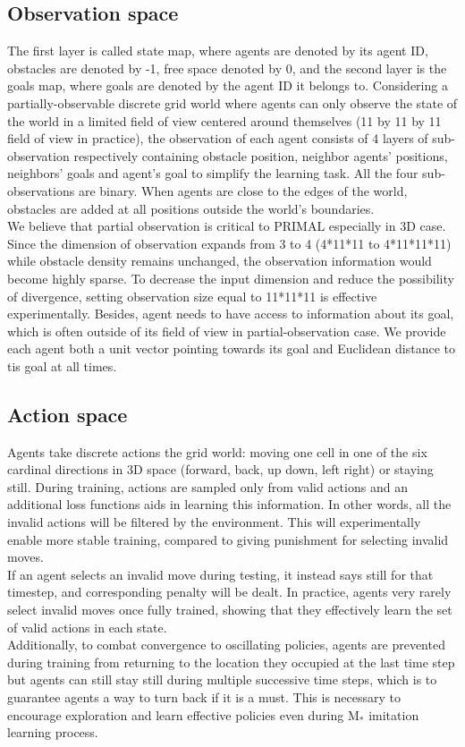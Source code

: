 \documentclass[sigconf,authordraft, nonacm=true]{acmart}
\begin{document}
\subsection{Observation space}
The first layer is called state map, where agents are denoted by its agent ID, obstacles are denoted by -1, free space denoted by 0, and the second layer is the goals map, where goals are denoted by the agent ID it belongs to.
Considering a partially-observable discrete grid world where agents can only observe the state of the world in a limited field of view centered around themselves (11 by 11 by 11 field of view in practice), the observation of each agent consists of 4 layers of sub-observation respectively containing obstacle position, neighbor agents’ positions, neighbors’ goals and agent’s goal to simplify the learning task. All the four sub-observations are binary. When agents are close to the edges of the world, obstacles are added at all positions outside the world’s boundaries.
\\We believe that partial observation is critical to PRIMAL especially in 3D case. Since the dimension of observation expands from 3 to 4 (4*11*11 to 4*11*11*11) while obstacle density remains unchanged, the observation information would become highly sparse. To decrease the input dimension and reduce the possibility of divergence, setting observation size equal to 11*11*11 is effective experimentally.
Besides, agent needs to have access to information about its goal, which is often outside of its field of view in partial-observation case. We provide each agent both a unit vector pointing towards its goal and Euclidean distance to tis goal at all times. 

\subsection{Action space}
Agents take discrete actions the grid world: moving one cell in one of the six cardinal directions in 3D space (forward, back, up down, left right) or staying still. During training, actions are sampled only from valid actions and an additional loss functions aids in learning this information. In other words, all the invalid actions will be filtered by the environment. This will experimentally enable more stable training, compared to giving punishment for selecting invalid moves. 
\\If an agent selects an invalid move during testing, it instead says still for that timestep, and corresponding penalty will be dealt. In practice, agents very rarely select invalid moves once fully trained, showing that they effectively learn the set of valid actions in each state.
\\Additionally, to combat convergence to oscillating policies, agents are prevented during training from returning to the location they occupied at the last time step but agents can still stay still during multiple successive time steps, which is to guarantee agents a way to turn back if it is a must. This is necessary to encourage exploration and learn effective policies even during M${_*}$ imitation learning process.
\end{document}
